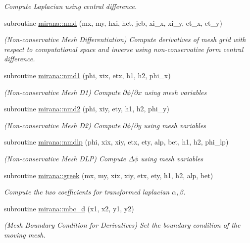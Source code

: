 \begin{DoxyCompactItemize}
\begin{DoxyCompactList}\small\item\em Compute Laplacian using central difference. \end{DoxyCompactList}\item 
subroutine \hyperlink{namespacemirana_a53c223d4530275ef3fc6a5820f5b0990}{mirana\+::nmd} (mx, my, hxi, het, jcb, xi\+\_\+x, xi\+\_\+y, et\+\_\+x, et\+\_\+y)
\begin{DoxyCompactList}\small\item\em (Non-\/conservative Mesh Differentiation) Compute derivatives of mesh grid with respect to computational space and inverse using non-\/conservative form central difference. \end{DoxyCompactList}\item 
subroutine \hyperlink{namespacemirana_a6b48fffbaaa6f2256928cd73d8891261}{mirana\+::nmd1} (phi, xix, etx, h1, h2, phi\+\_\+x)
\begin{DoxyCompactList}\small\item\em (Non-\/conservative Mesh D1) Compute $\partial\phi/\partial x$ using mesh variables \end{DoxyCompactList}\item 
subroutine \hyperlink{namespacemirana_a04bd9101c8bdc2f8b69892bd773f3055}{mirana\+::nmd2} (phi, xiy, ety, h1, h2, phi\+\_\+y)
\begin{DoxyCompactList}\small\item\em (Non-\/conservative Mesh D2) Compute $\partial\phi/\partial y$ using mesh variables \end{DoxyCompactList}\item 
subroutine \hyperlink{namespacemirana_a503a76ad6fbdf28508f8d71786bed518}{mirana\+::nmdlp} (phi, xix, xiy, etx, ety, alp, bet, h1, h2, phi\+\_\+lp)
\begin{DoxyCompactList}\small\item\em (Non-\/conservative Mesh D\+L\+P) Compute $\Delta\phi$ using mesh variables \end{DoxyCompactList}\item 
subroutine \hyperlink{namespacemirana_a7530ea2e7b2dfe85f3a088d24de59f1d}{mirana\+::greek} (mx, my, xix, xiy, etx, ety, h1, h2, alp, bet)
\begin{DoxyCompactList}\small\item\em Compute the two coefficients for transformed laplacian $\alpha,\beta$. \end{DoxyCompactList}\item 
subroutine \hyperlink{namespacemirana_a65a514d206d0e8ae53253938d2aff553}{mirana\+::mbc\+\_\+d} (x1, x2, y1, y2)
\begin{DoxyCompactList}\small\item\em (Mesh Boundary Condition for Derivatives) Set the boundary condition of the moving mesh. \end{DoxyCompactList}\end{DoxyCompactItemize}
